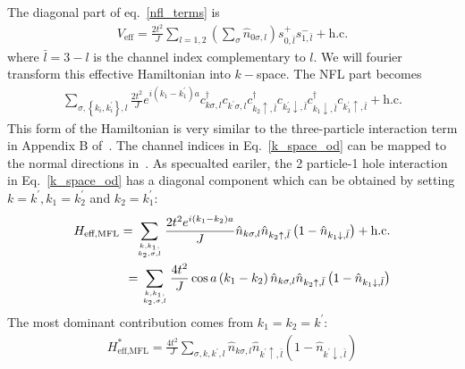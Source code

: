 \documentclass[reprint,prb,superscriptaddress]{revtex4-2}
\begin{document}
The diagonal part of eq.~\ref{nfl_terms} is
\begin{equation}\begin{aligned}
	V_\text{eff} = \frac{2t^2}{J}\sum_{l=1,2}\left(\sum_\sigma \hat n_{0\sigma,l}\right) s^+_{0,\bar l}s^-_{1,\bar l} + \text{h.c.}
\end{aligned}\end{equation}
where \(\bar l = 3 - l\) is the channel index complementary to \(l\). We will fourier transform this effective Hamiltonian into \(k-\)space. The NFL part becomes
\begin{equation}\begin{aligned}
	\label{k_space_od}
	\sum_{\sigma, \left\{k_i,k_i^\prime\right\},l} \frac{2t^2}{J}e^{i\left(k_1 - k_1^\prime\right)a}c^\dagger_{k\sigma,l}c_{k^\prime\sigma,l}c^\dagger_{k_2 \uparrow, \bar l}c_{k_2^\prime \downarrow,\bar l}c^\dagger_{k_1 \downarrow,\bar l}c_{k_1^\prime \uparrow, \bar l} + \text{h.c.} 
\end{aligned}\end{equation}
This form of the Hamiltonian is very similar to the three-particle interaction term in Appendix B of~\cite{anirbanmott1}. The channel indices in Eq.~\ref{k_space_od} can be mapped to the normal directions in~\cite{anirbanmott1}. As specualted eariler, the 2 particle-1 hole interaction in Eq.~\ref{k_space_od} has a diagonal component which can be obtained by setting \(k=k^\prime, k_1 = k_2^\prime\) and \(k_2 = k_1^\prime\):
\begin{equation}\begin{aligned}
	H_\text{eff,MFL} = \sum_{k, k_1, \atop{k_2,\sigma,  l}} \frac{2t^2e^{i\left(k_1 - k_2\right)a}}{J} \hat n_{k\sigma,l} \hat n_{k_2 \uparrow, \bar l}\left(1 - \hat n_{k_1 \downarrow,\bar l}\right) + \text{h.c.}\\
	= \sum_{k, k_1, \atop{k_2,\sigma,  l}} \frac{4t^2}{J} \cos a\left(k_1 - k_2\right)  \hat n_{k\sigma,l} \hat n_{k_2 \uparrow, \bar l}\left(1 - \hat n_{k_1 \downarrow,\bar l}\right)
\end{aligned}\end{equation}
The most dominant contribution comes from \(k_1 = k_2 = k^\prime\):
\begin{equation}\begin{aligned}
	\label{mfl_large}
	H^*_\text{eff,MFL} = \frac{4t^2}{J} \sum_{\sigma, k, k^\prime, l} \hat n_{k\sigma,l} \hat n_{k^\prime \uparrow, \bar l}\left(1 - \hat n_{k^\prime \downarrow,\bar l}\right)
\end{aligned}\end{equation}
\end{document}

